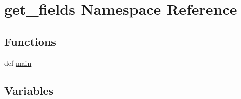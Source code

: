 \hypertarget{namespaceget__fields}{\section{get\-\_\-fields Namespace Reference}
\label{namespaceget__fields}
}
\subsection*{Functions}
\begin{DoxyCompactItemize}
\item 
def \hyperlink{namespaceget__fields_abd05708e7622740f51fe55724ff06c6f}{main}
\end{DoxyCompactItemize}
\subsection*{Variables}
